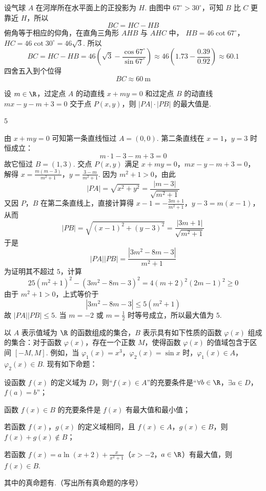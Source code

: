 \begin{solution}
设气球 \(A\) 在河岸所在水平面上的正投影为 \(H\). 由图中 \(67^\circ>30^\circ\)，可知 \(B\) 比 \(C\) 更靠近 \(H\)，所以
\[
BC=HC-HB
\]
俯角等于相应的仰角，在直角三角形 \(AHB\) 与 \(AHC\) 中，
\(HB=46\cot67^{\circ}\)，\(HC=46\cot30^{\circ}=46\sqrt3\).
所以
\[
BC=HC-HB=46\left(\sqrt3-\frac{\cos67^{\circ}}{\sin67^{\circ}}\right)
\approx46\left(1.73-\frac{0.39}{0.92}\right)\approx60.1
\]
四舍五入到个位得
\[
BC\approx60\mathrm{~m}
\]
\end{solution}

\begin{problem}
设 \(m \in \R\)，过定点 \(A\) 的动直线 \(x + my = 0\) 和过定点 \(B\) 的动直线 \(mx - y - m + 3 = 0\) 交于点 \(P(x, y)\)，则 \(|PA| \cdot |PB|\) 的最大值是\fillinblank{}.
\end{problem}

\begin{answer}
\(5\)
\end{answer}

\begin{solution}
由 \(x+my=0\) 可知第一条直线恒过 \(A=(0,0)\). 第二条直线在 \(x=1\)，\(y=3\) 时恒成立：
\[
m\cdot1-3-m+3=0
\]
故它恒过 \(B=(1,3)\). 交点 \(P(x,y)\) 满足
\(x+my=0\)，\(mx-y-m+3=0\)，
解得
\(x=\frac{m(m-3)}{m^2+1}\)，\(y=\frac{3-m}{m^2+1}\).
因为 \(m^2+1>0\)，由此
\[
|PA|=\sqrt{x^2+y^2}=\frac{|m-3|}{\sqrt{m^2+1}}
\]
又因 \(P\)，\(B\) 在第二条直线上，直接计算得
\(x-1=-\frac{3m+1}{m^2+1}\)，\(y-3=m(x-1)\)，
从而
\[
|PB|=\sqrt{(x-1)^2+(y-3)^2}=\frac{|3m+1|}{\sqrt{m^2+1}}
\]
于是
\[
|PA||PB|=\frac{|3m^2-8m-3|}{m^2+1}
\]
为证明其不超过 \(5\)，计算
\[
25(m^2+1)^2-(3m^2-8m-3)^2=4(m+2)^2(2m-1)^2\geqslant0
\]
由于 \(m^2+1>0\)，上式等价于
\[
|3m^2-8m-3|\leqslant5(m^2+1)
\]
故 \(|PA||PB|\leqslant5\). 当 \(m=-2\) 或 \(m=\frac12\) 时等号成立，所以最大值为 \(5\).
\end{solution}

\begin{problem}
以 \(A\) 表示值域为 \(\R\) 的函数组成的集合，\(B\) 表示具有如下性质的函数 \(\varphi(x)\) 组成的集合：对于函数 \(\varphi(x)\)，存在一个正数 \(M\)，使得函数 \(\varphi(x)\) 的值域包含于区间 \([-M, M]\). 例如，当 \(\varphi_1(x) = x^3\)，\(\varphi_2(x) = \sin x\) 时，\(\varphi_1(x) \in A\)，\(\varphi_2(x) \in B\). 现有如下命题：

\begin{circlelist}
\item 设函数 \(f(x)\) 的定义域为 \(D\)，则“\(f(x) \in A\)”的充要条件是“\(\forall b \in \R\)，\(\exists a \in D\)，\(f(a)=b\)”；
\item 函数 \(f(x) \in B\) 的充要条件是 \(f(x)\) 有最大值和最小值；
\item 若函数 \(f(x)\)，\(g(x)\) 的定义域相同，且 \(f(x) \in A\)，\(g(x) \in B\)，则 \(f(x) + g(x) \notin B\)；
\item 若函数 \(f(x) = a\ln(x + 2) + \frac{x}{x^{2} + 1}\)（\(x > -2\)，\(a \in \R\)）有最大值，则 \(f(x) \in B\).
\end{circlelist}

其中的真命题有\fillinblank{}.（写出所有真命题的序号）
\end{problem}


